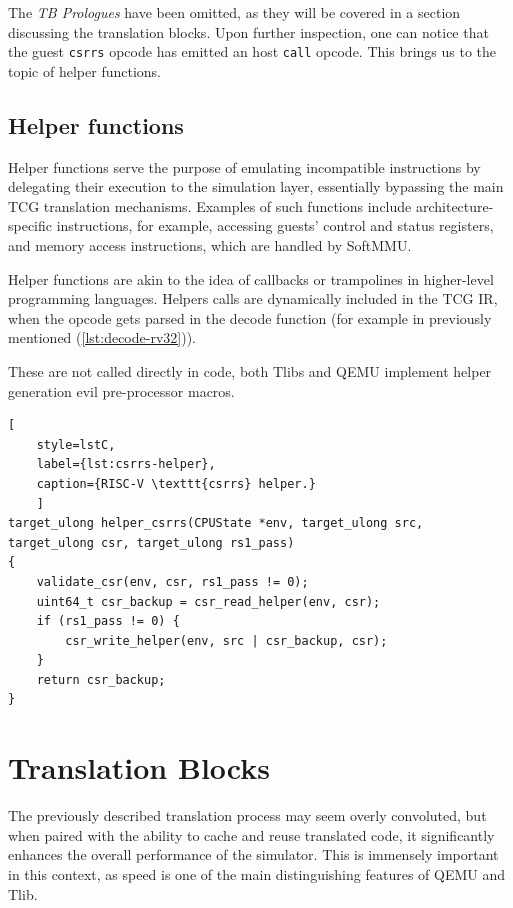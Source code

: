 \noindent
The \textit{TB Prologues} have been omitted, as they will be covered in a section discussing the translation blocks.
Upon further inspection, one can notice that the guest \texttt{csrrs} opcode has emitted an host \texttt{call} opcode.
This brings us to the topic of helper functions.

\pagebreak
\subsection{Helper functions}

Helper functions serve the purpose of emulating incompatible instructions by delegating their execution to the
simulation layer, essentially bypassing the main TCG translation mechanisms. Examples of such functions include
architecture-specific instructions, for example, accessing guests' control and status registers, and memory access
instructions, which are handled by SoftMMU.

Helper functions are akin to the idea of callbacks or trampolines in higher-level programming languages. Helpers calls
are dynamically included in the TCG IR, when the opcode gets parsed in the decode function (for example in previously
mentioned (\ref{lst:decode-rv32})).

These are not called directly in code, both Tlibs and QEMU implement helper generation evil pre-processor macros.


\begin{lstlisting}[
    style=lstC,
    label={lst:csrrs-helper},
    caption={RISC-V \texttt{csrrs} helper.}
    ]
target_ulong helper_csrrs(CPUState *env, target_ulong src, target_ulong csr, target_ulong rs1_pass)
{
    validate_csr(env, csr, rs1_pass != 0);
    uint64_t csr_backup = csr_read_helper(env, csr);
    if (rs1_pass != 0) {
        csr_write_helper(env, src | csr_backup, csr);
    }
    return csr_backup;
}
\end{lstlisting}

\section{Translation Blocks}

The previously described translation process may seem overly convoluted, but when paired with the ability to cache and
reuse translated code, it significantly enhances the overall performance of the simulator. This is immensely important
in this context, as speed is one of the main distinguishing features of QEMU and Tlib.

